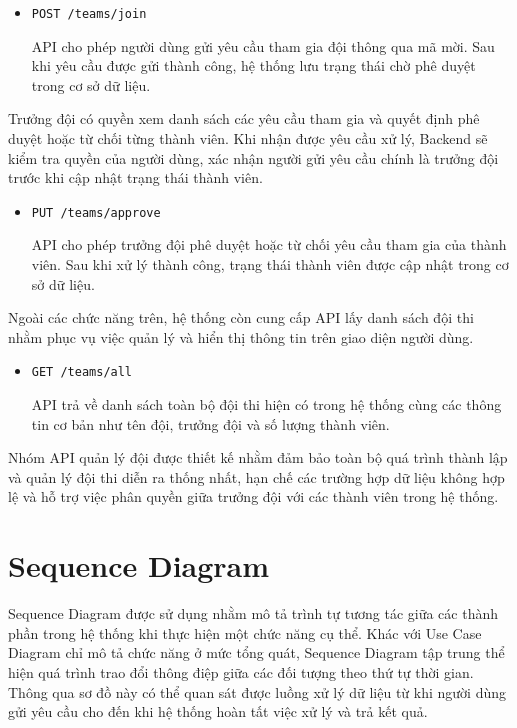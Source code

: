 \begin{itemize}
	\item \texttt{POST /teams/join}
	
	API cho phép người dùng gửi yêu cầu tham gia đội thông qua mã mời. Sau khi yêu cầu được gửi thành công, hệ thống lưu trạng thái chờ phê duyệt trong cơ sở dữ liệu.
\end{itemize}

Trưởng đội có quyền xem danh sách các yêu cầu tham gia và quyết định phê duyệt hoặc từ chối từng thành viên. Khi nhận được yêu cầu xử lý, Backend sẽ kiểm tra quyền của người dùng, xác nhận người gửi yêu cầu chính là trưởng đội trước khi cập nhật trạng thái thành viên.

\begin{itemize}
	\item \texttt{PUT /teams/approve}
	
	API cho phép trưởng đội phê duyệt hoặc từ chối yêu cầu tham gia của thành viên. Sau khi xử lý thành công, trạng thái thành viên được cập nhật trong cơ sở dữ liệu.
\end{itemize}

Ngoài các chức năng trên, hệ thống còn cung cấp API lấy danh sách đội thi nhằm phục vụ việc quản lý và hiển thị thông tin trên giao diện người dùng.

\begin{itemize}
	\item \texttt{GET /teams/all}
	
	API trả về danh sách toàn bộ đội thi hiện có trong hệ thống cùng các thông tin cơ bản như tên đội, trưởng đội và số lượng thành viên.
\end{itemize}

Nhóm API quản lý đội được thiết kế nhằm đảm bảo toàn bộ quá trình thành lập và quản lý đội thi diễn ra thống nhất, hạn chế các trường hợp dữ liệu không hợp lệ và hỗ trợ việc phân quyền giữa trưởng đội với các thành viên trong hệ thống.%
\section{Sequence Diagram}

Sequence Diagram được sử dụng nhằm mô tả trình tự tương tác giữa các thành phần trong hệ thống khi thực hiện một chức năng cụ thể. Khác với Use Case Diagram chỉ mô tả chức năng ở mức tổng quát, Sequence Diagram tập trung thể hiện quá trình trao đổi thông điệp giữa các đối tượng theo thứ tự thời gian. Thông qua sơ đồ này có thể quan sát được luồng xử lý dữ liệu từ khi người dùng gửi yêu cầu cho đến khi hệ thống hoàn tất việc xử lý và trả kết quả.


